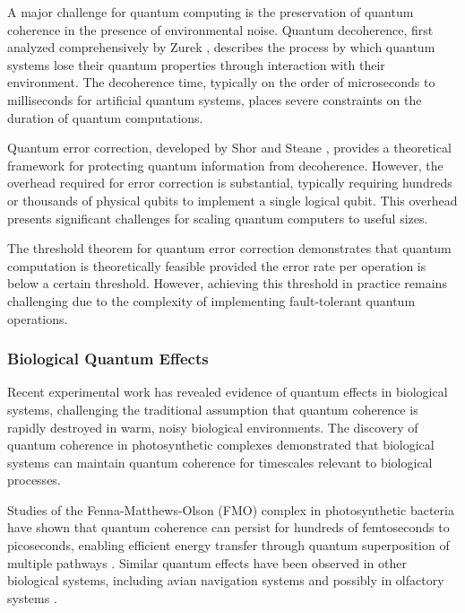 \documentclass[12pt,a4paper]{article}
\theoremstyle{definition}
\begin{document}
A major challenge for quantum computing is the preservation of quantum coherence in the presence of environmental noise. Quantum decoherence, first analyzed comprehensively by Zurek \cite{zurek1981pointer}, describes the process by which quantum systems lose their quantum properties through interaction with their environment. The decoherence time, typically on the order of microseconds to milliseconds for artificial quantum systems, places severe constraints on the duration of quantum computations.

Quantum error correction, developed by Shor \cite{shor1995scheme} and Steane \cite{steane1996error}, provides a theoretical framework for protecting quantum information from decoherence. However, the overhead required for error correction is substantial, typically requiring hundreds or thousands of physical qubits to implement a single logical qubit. This overhead presents significant challenges for scaling quantum computers to useful sizes.

The threshold theorem for quantum error correction \cite{aharonov2008fault} demonstrates that quantum computation is theoretically feasible provided the error rate per operation is below a certain threshold. However, achieving this threshold in practice remains challenging due to the complexity of implementing fault-tolerant quantum operations.

\subsubsection{Biological Quantum Effects}

Recent experimental work has revealed evidence of quantum effects in biological systems, challenging the traditional assumption that quantum coherence is rapidly destroyed in warm, noisy biological environments. The discovery of quantum coherence in photosynthetic complexes \cite{engel2007evidence, lee2007coherence} demonstrated that biological systems can maintain quantum coherence for timescales relevant to biological processes.

Studies of the Fenna-Matthews-Olson (FMO) complex in photosynthetic bacteria have shown that quantum coherence can persist for hundreds of femtoseconds to picoseconds, enabling efficient energy transfer through quantum superposition of multiple pathways \cite{scholes2011lessons}. Similar quantum effects have been observed in other biological systems, including avian navigation systems \cite{ritz2000resonance} and possibly in olfactory systems \cite{brookes2007could}.
\end{document}
